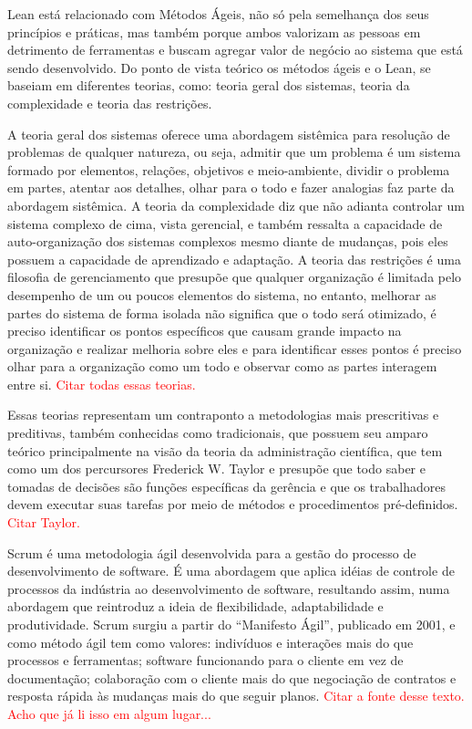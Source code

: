 Lean está relacionado com Métodos Ágeis, não só pela semelhança dos seus princípios e práticas, mas também porque ambos valorizam as pessoas em detrimento de ferramentas e buscam agregar valor de negócio ao sistema que está sendo desenvolvido. Do ponto de vista teórico os métodos ágeis e o Lean, se baseiam em diferentes teorias, como: teoria geral dos sistemas, teoria da complexidade e teoria das restrições. 

A teoria geral dos sistemas oferece uma abordagem sistêmica para resolução de problemas de qualquer natureza, ou seja, admitir que um problema é um sistema formado por elementos, relações, objetivos e meio-ambiente, dividir o problema em partes, atentar aos detalhes, olhar para o todo e fazer analogias faz parte da abordagem sistêmica. A teoria da complexidade diz que não adianta controlar um sistema complexo de cima, vista gerencial, e também ressalta a capacidade de auto-organização dos sistemas complexos mesmo diante de mudanças, pois eles possuem a capacidade de aprendizado e adaptação. A teoria das restrições é uma filosofia de gerenciamento que presupõe que qualquer organização é limitada pelo desempenho de um ou poucos elementos do sistema, no entanto, melhorar as partes do sistema de forma isolada não significa que o todo será otimizado, é preciso identificar os pontos específicos que causam grande impacto na organização e realizar melhoria sobre eles e para identificar esses pontos é preciso olhar para a organização como um todo e observar como as partes interagem entre si.
\textcolor{red}{{Citar todas essas teorias.}}

Essas teorias representam um contraponto a metodologias mais prescritivas e preditivas, também conhecidas como tradicionais, que possuem seu amparo teórico principalmente na visão da teoria da administração científica, que tem como um dos percursores Frederick W. Taylor e presupõe que todo saber e tomadas de decisões são funções específicas da gerência e que os trabalhadores devem executar suas tarefas por meio de métodos e procedimentos pré-definidos.
\textcolor{red}{{Citar Taylor.}}

Scrum é uma metodologia ágil desenvolvida para a gestão do processo de desenvolvimento de software. É uma abordagem que aplica idéias de controle de processos da indústria ao desenvolvimento de software, resultando assim, numa abordagem que reintroduz a ideia de flexibilidade, adaptabilidade e produtividade. Scrum surgiu a partir do “Manifesto Ágil”, publicado em 2001, e como método ágil tem como valores: indivíduos e interações mais do que processos e ferramentas; software funcionando para o cliente em vez de documentação; colaboração com o cliente mais do que negociação de contratos e resposta rápida às mudanças mais do que seguir planos. 
\textcolor{red}{{Citar a fonte desse texto. Acho que já li isso em algum lugar...}}

